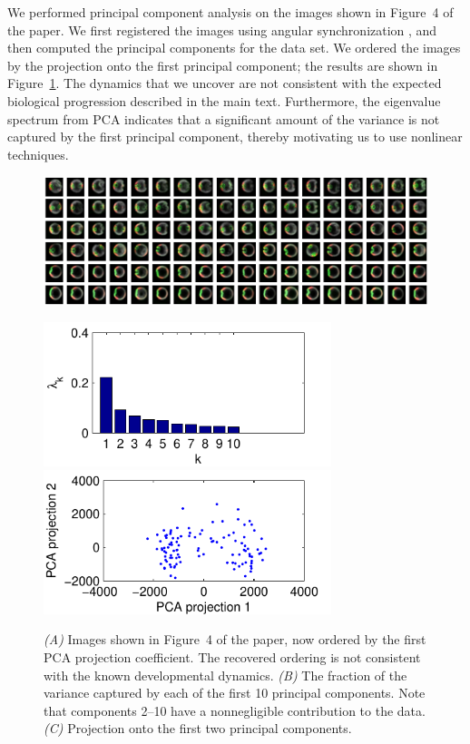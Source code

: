 \documentclass[12pt]{article}
\begin{document}
We performed principal component analysis on the images shown in Figure~4 of the paper.
%
We first registered the images using angular synchronization \cite{singer2011angular}, and then computed the principal components for the data set.
%
We ordered the images by the projection onto the first principal component; the results are shown in Figure~\ref{fig:PCA_results}.
%
The dynamics that we uncover are not consistent with the expected biological progression described in the main text.
%
Furthermore, the eigenvalue spectrum from PCA indicates that a significant amount of the variance is not captured by the first principal component, thereby motivating us to use nonlinear techniques. 

\begin{figure}[H]
\includegraphics[width=16.8cm]{data2_PCA_ordered}

\includegraphics[width=8.4cm]{data2_PCA_variance}
\includegraphics[width=8.4cm]{data2_PCA_proj}

\caption{{\it (A)} Images shown in Figure~4 of the paper, now ordered by the first PCA projection coefficient. The recovered ordering is not consistent with the known developmental dynamics. {\it (B)} The fraction of the variance captured by each of the first 10 principal components. Note that components 2--10 have a nonnegligible contribution to the data. {\it (C)} Projection onto the first two principal components.}
\label{fig:PCA_results}
\end{figure}
\end{document}

